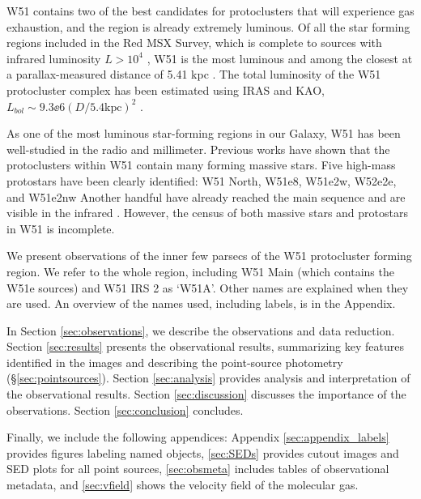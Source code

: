 W51 contains two of the best candidates for protoclusters that will experience
gas exhaustion, and the region is already extremely luminous.  Of all the star
forming regions included in the Red MSX Survey, which is complete to sources
with infrared luminosity $L>10^4$ \lsun, W51 is the most luminous
\citep{Urquhart2014a} and among the closest at a parallax-measured distance of
5.41 kpc \citep{Sato2010a,Xu2009a}.  The total luminosity of the W51
protocluster complex has been estimated using IRAS and KAO,
$L_{bol}\sim9.3\ee{6} (D/5.4\mathrm{kpc})^2$ \lsun
\citep{Harvey1986a,Sievers1991a}.  

As one of the most luminous star-forming regions in our Galaxy, W51 has been
well-studied in the radio and millimeter.  
Previous works have shown that the protoclusters within W51 contain many
forming massive stars. Five high-mass protostars have been clearly identified:
W51 North, W51e8, W51e2w, W52e2e, and W51e2nw
\citep{Zhang1997a,Keto2008b,Zapata2008a,Zapata2009a,Zapata2010a,Shi2010b,Shi2010a,Goddi2015a}
Another handful have already reached the main sequence and are visible in the
infrared \citep{Goldader1994a,Okumura2000a,Kumar2004a,Barbosa2008a,Figueredo2008a}.
However, the census of both massive stars and protostars in W51 is incomplete.

We present observations of the inner few parsecs of the W51 protocluster
forming region.  We refer to the whole region, including W51 Main (which
contains the W51e sources) and W51 IRS 2 as `W51A'.  Other names are explained
when they are used.  An overview of the names used, including labels, is in the
Appendix.

In Section \ref{sec:observations}, we describe the observations and data
reduction.  Section \ref{sec:results} presents the observational results,
summarizing key features identified in the images and describing the
point-source photometry (\S \ref{sec:pointsources}).  Section
\ref{sec:analysis} provides analysis and interpretation of the observational
results.  Section \ref{sec:discussion} discusses the importance of the
observations.  Section \ref{sec:conclusion} concludes.

Finally, we include the following appendices: Appendix
\ref{sec:appendix_labels} provides figures labeling named objects,
\ref{sec:SEDs} provides cutout images and SED plots for all point sources,
\ref{sec:obsmeta} includes tables of observational metadata, and
\ref{sec:vfield} shows the velocity field of the molecular gas.


